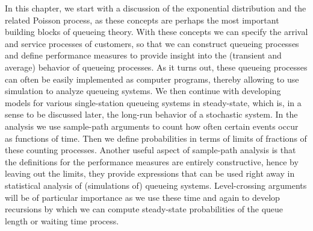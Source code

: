 In this chapter, we start with a discussion of the exponential
distribution and the related Poisson process, as these concepts are
perhaps the most important building blocks of queueing theory. With
these concepts we can specify the arrival and service processes of
customers, so that we can construct queueing processes and define
performance measures to provide insight into the (transient and
average) behavior of queueing processes. As it turns out, these
queueing processes can often be easily implemented as computer programs, thereby
allowing to use simulation to analyze queueing systems. We then
continue with developing models for various single-station queueing
systems in steady-state, which is, in a sense to be discussed later,
the long-run behavior of a stochastic system. In the analysis we use
sample-path arguments to count how often certain events occur as
functions of time. Then we define probabilities in terms of limits of
fractions of these counting processes. Another useful aspect of
sample-path analysis is that the definitions for the performance
measures are entirely constructive, hence by leaving out the limits,
they provide expressions that can be used right away in statistical
analysis of (simulations of) queueing systems. Level-crossing
arguments will be of particular importance as we use these time and
again to develop recursions by which we can compute steady-state
probabilities of the queue length or waiting time process.


